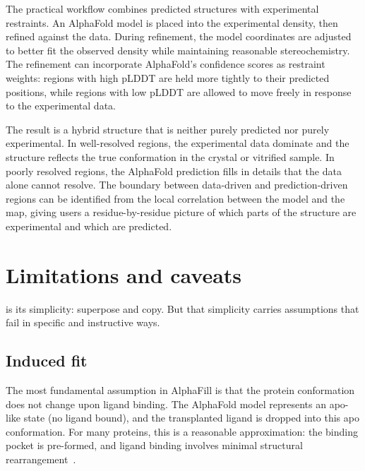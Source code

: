 The practical workflow combines predicted structures with experimental restraints. An AlphaFold model is placed into the experimental density, then refined against the data. During refinement, the model coordinates are adjusted to better fit the observed density while maintaining reasonable stereochemistry. The refinement can incorporate AlphaFold's confidence scores as restraint weights: regions with high pLDDT are held more tightly to their predicted positions, while regions with low pLDDT are allowed to move freely in response to the experimental data.

The result is a hybrid structure that is neither purely predicted nor purely experimental. In well-resolved regions, the experimental data dominate and the structure reflects the true conformation in the crystal or vitrified sample. In poorly resolved regions, the AlphaFold prediction fills in details that the data alone cannot resolve. The boundary between data-driven and prediction-driven regions can be identified from the local correlation between the model and the map, giving users a residue-by-residue picture of which parts of the structure are experimental and which are predicted.


\section{Limitations and caveats}
\label{sec:limitations}

 is its simplicity: superpose and copy. But that simplicity carries assumptions that fail in specific and instructive ways.

\subsection{Induced fit}
\label{sec:induced-fit}

The most fundamental assumption in AlphaFill is that the protein conformation does not change upon ligand binding. The AlphaFold model represents an apo-like state (no ligand bound), and the transplanted ligand is dropped into this apo conformation. For many proteins, this is a reasonable approximation: the binding pocket is pre-formed, and ligand binding involves minimal structural rearrangement~\cite{koshland1958}.

